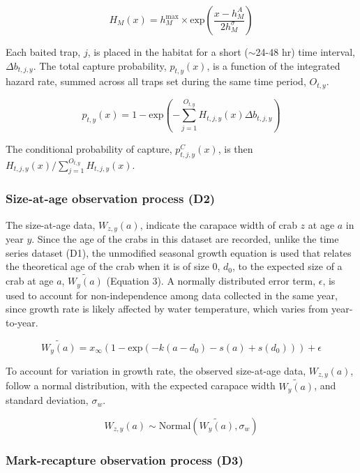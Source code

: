 \documentclass{article}
\begin{document}
\begin{equation}
H_M(x) = h^{\text{max}}_M \times \text{exp}(\frac{x-h^{A}_M}{2 h^{\sigma}_M})
\end{equation}

Each baited trap, $j$, is placed in the habitat for a short ($\sim$24-48 hr) time interval, $\Delta b_{t,j,y}$. The total capture probability, $p_{t,y}(x)$, is a function of the integrated hazard rate, summed across all traps set during the same time period, $O_{t,y}$.

\begin{equation}
p_{t,y}(x) = 1-\text{exp}\left(-\sum_{j=1}^{O_{t,y}} H_{t,j,y}(x)\Delta b_{t,j,y}\right)
\end{equation}

The conditional probability of capture, $p^C_{t,j,y}(x)$, is then $H_{t,j,y}(x)/\sum_{j=1}^{O_{t,y}}H_{t,j,y}(x)$.

\subsubsection*{Size-at-age observation process (D2)}

The size-at-age data, $W_{z,y}(a)$, indicate the carapace width of crab $z$ at age $a$ in year $y$. Since the age of the crabs in this dataset are recorded, unlike the time series dataset (D1), the unmodified seasonal growth equation is used that relates the theoretical age of the crab when it is of size 0, $d_0$, to the expected size of a crab at age $a$, $\widetilde{W_y(a)}$ (Equation 3). A normally distributed error term, $\epsilon$, is used to account for non-independence among data collected in the same year, since growth rate is likely affected by water temperature, which varies from year-to-year.

\begin{equation}
\widetilde{W_y(a)} = x_{\infty}(1-\text{exp}(-k(a-d_0) - s(a) + s(d_0))) + \epsilon
\end{equation}

To account for variation in growth rate, the observed size-at-age data, $W_{z,y}(a)$, follow a normal distribution, with the expected carapace width $\widetilde{W_y(a)}$, and standard deviation, $\sigma_{w}$.

\begin{equation}
W_{z,y}(a) \sim \text{Normal}(\widetilde{W_y(a)}, \sigma_{w})
\end{equation}

\subsubsection*{Mark-recapture observation process (D3)}
\end{document}
